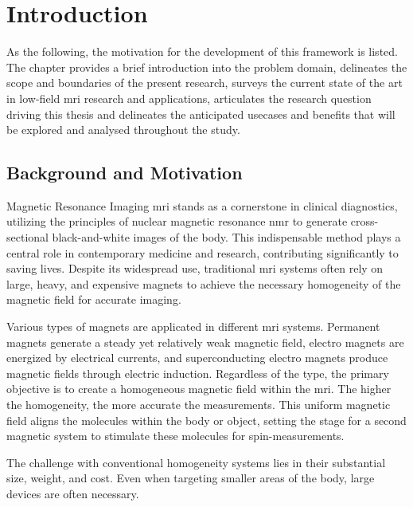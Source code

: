 \hypertarget{introduction}{%
\chapter{Introduction}\label{introduction}}

As the following, the motivation for the development of this framework
is listed. The chapter provides a brief introduction into the problem
domain, delineates the scope and boundaries of the present research,
surveys the current state of the art in low-field \gls{mri} research and
applications, articulates the research question driving this thesis and
delineates the anticipated usecases and benefits that will be explored
and analysed throughout the study.

\hypertarget{background-and-motivation}{%
\section{Background and Motivation}\label{background-and-motivation}}

Magnetic Resonance Imaging \gls{mri} stands as a cornerstone in clinical
diagnostics, utilizing the principles of nuclear magnetic resonance
\gls{nmr} to generate cross-sectional black-and-white images of the
body. This indispensable method plays a central role in contemporary
medicine and research, contributing significantly to saving lives.
Despite its widespread use, traditional \gls{mri} systems often rely on
large, heavy, and expensive magnets to achieve the necessary homogeneity
of the magnetic field for accurate imaging. \cite{Nitz2016}

Various types of magnets are applicated in different \gls{mri} systems.
Permanent magnets generate a steady yet relatively weak magnetic field,
electro magnets are energized by electrical currents, and
superconducting electro magnets produce magnetic fields through electric
induction. Regardless of the type, the primary objective is to create a
homogeneous magnetic field within the \gls{mri}. The higher the
homogeneity, the more accurate the measurements. This uniform magnetic
field aligns the molecules within the body or object, setting the stage
for a second magnetic system to stimulate these molecules for
spin-measurements.

The challenge with conventional homogeneity systems lies in their
substantial size, weight, and cost. Even when targeting smaller areas of
the body, large devices are often necessary.

